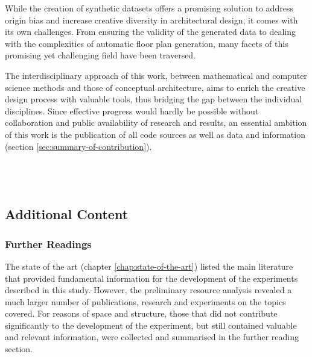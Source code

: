 \documentclass[a4paper, 12pt]{report}
\begin{document}
While the creation of synthetic datasets offers a promising solution to address \gls{origin bias} and increase creative diversity in architectural design, it comes with its own challenges. From ensuring the validity of the generated data to dealing with the complexities of automatic floor plan generation, many facets of this promising yet challenging field have been traversed.

The interdisciplinary approach of this work, between mathematical and computer science methods and those of conceptual architecture, aims to enrich the creative design process with valuable tools, thus bridging the gap between the individual disciplines. Since effective progress would hardly be possible without collaboration and public availability of research and results, an essential ambition of this work is the publication of all code sources as well as data and information (section \ref{sec:summary-of-contribution}).

\printbibheading[heading=bibintoc, title={Bibliography}]
\printbibliography[heading=none]

\newpage
{}

\part{\appendixname}\label{part:appendix}

\newpage \ \thispagestyle{empty}
\newpage\clearpage

\appendix

\chapter{Additional Content}\label{chap:additional-content}

\section{Further Readings}\label{sec:further-readings}

The state of the art (chapter \ref{chap:state-of-the-art}) listed the main literature that provided fundamental information for the development of the experiments described in this study. However, the preliminary resource analysis revealed a much larger number of publications, research and experiments on the topics covered. For reasons of space and structure, those that did not contribute significantly to the development of the experiment, but still contained valuable and relevant information, were collected and summarised in the further reading section.
\end{document}
